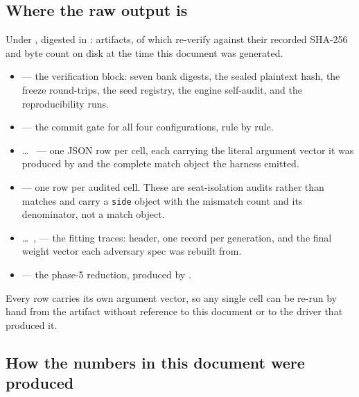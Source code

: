 \subsection*{Where the raw output is}

Under , digested in
: \vsevenManifestRuns{} artifacts, of which
\vsevenManifestVerified{} re-verify against their recorded SHA-256 and byte count on disk at the time
this document was generated.

\begin{itemize}
\item {} --- the verification block: seven bank digests, the sealed plaintext hash,
  the freeze round-trips, the seed registry, the engine self-audit, and the reproducibility runs.
\item {} --- the commit gate for all four configurations, rule by rule.
\item {} \ldots\  --- one JSON row per cell, each carrying
  the literal argument vector it was produced by and the complete match object the harness emitted.
\item {} --- one row per audited cell. These are seat-isolation audits rather
  than matches and carry a \texttt{side} object with the mismatch count and its denominator, not a
  match object.
\item {} \ldots\ ,  --- the
  fitting traces: header, one record per generation, and the final weight vector each adversary spec
  was rebuilt from.
\item {} --- the phase-5 reduction, produced by .
\end{itemize}

Every row carries its own argument vector, so any single cell can be re-run by hand from the artifact
without reference to this document or to the driver that produced it.

\subsection*{How the numbers in this document were produced}

